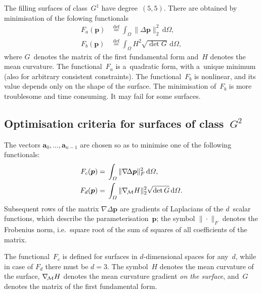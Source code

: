 The filling surfaces of class~$G^1$ have degree~$(5,5)$.
There are obtained by minimisation of the folowing functionals
\begin{align*}
  F_a(\bm{p}) &{}\stackrel{\mathrm{def}}{=}
  \int_{\varOmega}\|\Delta\bm{p}\|_2^2\,\mathrm{d}\varOmega, \\
  F_b(\bm{p}) &{}\stackrel{\mathrm{def}}{=}
  \int_{\varOmega}H^2\sqrt{\det G}\,\mathrm{d}\varOmega,
\end{align*}
where $G$~denotes the matrix of the first fundamental form and~$H$ denotes
the mean curvature. The functional~$F_a$ is a~quadratic form,
with a~unique minimum (also for arbitrary consistent constraints).
The functional~$F_b$ is nonlinear, and its value depends only on
the shape of the surface. The minimisation of~$F_b$ is more troublesome
and time consuming. It may fail for some surfaces.


\subsection{Optimisation criteria for surfaces of class~$G^2$}

The vectors $\bm{a}_0,\ldots,\bm{a}_{n-1}$ are chosen so as to minimise one
of the following functionals:
\begin{align*}
  F_c(\bm{p}) ={}& \int_{\varOmega}\|\nabla\!\Delta\bm{p}\|_F^2\,\mathrm{d}\varOmega, \\
  F_d(\bm{p}) ={}& \int_{\varOmega}\|\nabla_{\!\cal M}H\|_2^2\sqrt{\det G}\,\mathrm{d}\varOmega.
\end{align*}
Subsequent rows of the matrix $\nabla\!\Delta\bm{p}$ are gradients of Laplacians
of the $d$~scalar functions, which describe the parameterisation~$\bm{p}$; the
symbol $\|\cdot\|_F$ denotes the Frobenius norm, i.e.\ square root of the sum
of squares of all coefficients of the matrix.

The functional~$F_c$ is defined for surfaces in $d$-dimensional spaces for
any~$d$, while in case of $F_d$ there must be $d=3$.
The symbol~$H$ denotes the mean curvature of the surface,
$\nabla_{\!\cal M}H$ denotes the mean curvature gradient \emph{on the surface},
and~$G$ denotes the matrix of the first fundamental form.

